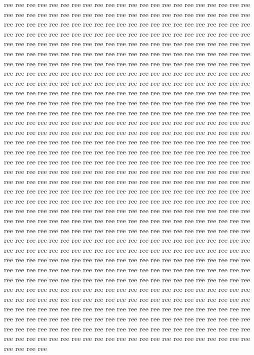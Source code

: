 ree ree ree ree ree ree ree ree ree ree ree ree ree ree ree ree ree ree ree ree ree ree ree ree ree ree ree ree ree ree ree ree ree ree ree ree ree ree ree ree ree ree ree ree ree ree ree ree ree ree ree ree ree ree ree ree ree ree ree ree ree ree ree ree ree ree ree ree ree ree ree ree ree ree ree ree ree ree ree ree ree ree ree ree ree ree ree ree ree ree ree ree ree ree ree ree ree ree ree ree ree ree ree ree ree ree ree ree ree ree ree ree ree ree ree ree ree ree ree ree ree ree ree ree ree ree ree ree ree ree ree ree ree ree ree ree ree ree ree ree ree ree ree ree ree ree ree ree ree ree ree ree ree ree ree ree ree ree ree ree ree ree ree ree ree ree ree ree ree ree ree ree ree ree ree ree ree ree ree ree ree ree ree ree ree ree ree ree ree ree ree ree ree ree ree ree ree ree ree ree ree ree ree ree ree ree ree ree ree ree ree ree ree ree ree ree ree ree ree ree ree ree ree ree ree ree ree ree ree ree ree ree ree ree ree ree ree ree ree ree ree ree ree ree ree ree ree ree ree ree ree ree ree ree ree ree ree ree ree ree ree ree ree ree ree ree ree ree ree ree ree ree ree ree ree ree ree ree ree ree ree ree ree ree ree ree ree ree ree ree ree ree ree ree ree ree ree ree ree ree ree ree ree ree ree ree ree ree ree ree ree ree ree ree ree ree ree ree ree ree ree ree ree ree ree ree ree ree ree ree ree ree ree ree ree ree ree ree ree ree ree ree ree ree ree ree ree ree ree ree ree ree ree ree ree ree ree ree ree ree ree ree ree ree ree ree ree ree ree ree ree ree ree ree ree ree ree ree ree ree ree ree ree ree ree ree ree ree ree ree ree ree ree ree ree ree ree ree ree ree ree ree ree ree ree ree ree ree ree ree ree ree ree ree ree ree ree ree ree ree ree ree ree ree ree ree ree ree ree ree ree ree ree ree ree ree ree ree ree ree ree ree ree ree ree ree ree ree ree ree ree ree ree ree ree ree ree ree ree ree ree ree ree ree ree ree ree ree ree ree ree ree ree ree ree ree ree ree ree ree ree ree ree ree ree ree ree ree ree ree ree ree ree ree ree ree ree ree ree ree ree ree ree ree ree ree ree ree ree ree ree ree ree ree ree ree ree ree ree ree ree ree ree ree ree ree ree ree ree ree ree ree ree ree ree ree ree ree ree ree ree ree ree ree ree ree ree ree ree ree ree ree ree ree ree ree ree ree ree ree ree ree ree ree ree ree ree ree ree ree ree ree ree ree ree ree ree ree ree ree ree ree ree ree ree ree ree ree ree ree ree ree ree ree ree ree ree ree ree ree ree ree ree ree ree ree ree ree ree ree ree ree ree ree ree ree ree ree ree ree ree ree ree ree ree ree ree ree ree ree ree ree ree ree ree ree ree ree ree ree ree ree ree ree ree ree ree ree ree ree ree ree ree ree ree ree ree ree ree ree ree ree ree ree ree ree ree ree ree ree ree ree ree ree ree ree ree ree ree ree ree ree ree ree ree ree ree ree ree ree ree ree ree ree ree ree ree ree ree ree ree ree ree ree ree ree ree ree ree ree ree ree ree ree ree ree ree ree ree ree ree ree ree ree ree ree ree ree ree ree ree ree ree ree ree ree ree ree ree ree ree ree ree ree ree ree ree ree ree ree ree ree ree ree ree ree ree ree ree ree ree ree ree ree ree ree ree ree ree ree ree ree ree ree

